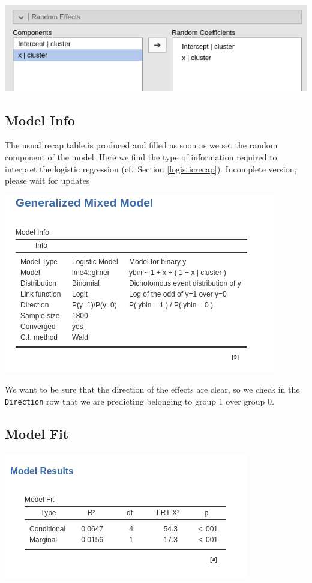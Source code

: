 \documentclass[
]{book}
\begin{document}
\includegraphics[width=0.8\linewidth]{bookletpics/5_logistic_input3}

\hypertarget{model-info-1}{%
\subsection{Model Info}\label{model-info-1}}

The usual recap table is produced and filled as soon as we set the random component of the model. Here we find the type of information required to interpret the logistic regression (cf.~Section \ref{logisticrecap}).
{ Incomplete version, please wait for updates }

\includegraphics[width=0.8\linewidth]{bookletpics/5_logistic_output1}

We want to be sure that the direction of the effects are clear, so we check in the \texttt{Direction} row that we are predicting belonging to group 1 over group 0.

\hypertarget{model-fit-3}{%
\subsection{Model Fit}\label{model-fit-3}}

\includegraphics[width=0.6\linewidth]{bookletpics/5_logistic_output2}
\end{document}
